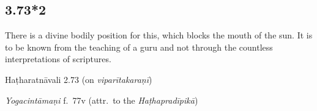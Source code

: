 \begin{ekdosis}
\begin{philcomm}[hp03_073_1]

\end{philcomm}



\subsection*{3.73*2}
\begin{translation}[hp03_073_2]
There is a divine bodily position for this, which blocks the mouth of the sun. It is to be known from the teaching of a guru and not through the countless interpretations of scriptures.
\end{translation}

\begin{sources}[hp03_073_2]
\end{sources}

\begin{testimonia}[hp03_073_2]
Haṭharatnāvali 2.73 (on \emph{viparītakaraṇī})
\begin{versinnote}
\end{versinnote}

\emph{Yogacintāmaṇi} f.~77v (attr.~to the \emph{Haṭhapradīpikā})
\begin{versinnote}
\end{versinnote}

\end{testimonia}


\end{ekdosis}
